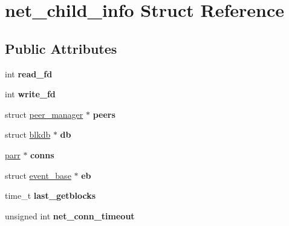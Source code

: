\hypertarget{structnet__child__info}{\section{net\-\_\-child\-\_\-info Struct Reference}
\label{structnet__child__info}
}
\subsection*{Public Attributes}
\begin{DoxyCompactItemize}
\item 
\hypertarget{structnet__child__info_aeb7c2e6b362b783a45f642b6657adb79}{int {\bfseries read\-\_\-fd}}\label{structnet__child__info_aeb7c2e6b362b783a45f642b6657adb79}

\item 
\hypertarget{structnet__child__info_a20f055e9469d205f63767478eb8b43d3}{int {\bfseries write\-\_\-fd}}\label{structnet__child__info_a20f055e9469d205f63767478eb8b43d3}

\item 
\hypertarget{structnet__child__info_a7d118ac5f9e703fc6683c85f924bcd23}{struct \hyperlink{structpeer__manager}{peer\-\_\-manager} $\ast$ {\bfseries peers}}\label{structnet__child__info_a7d118ac5f9e703fc6683c85f924bcd23}

\item 
\hypertarget{structnet__child__info_a65d7885acd7789351ccc097880bf9914}{struct \hyperlink{structblkdb}{blkdb} $\ast$ {\bfseries db}}\label{structnet__child__info_a65d7885acd7789351ccc097880bf9914}

\item 
\hypertarget{structnet__child__info_a6127de1099cbce59bc0d5c405999203b}{\hyperlink{structparr}{parr} $\ast$ {\bfseries conns}}\label{structnet__child__info_a6127de1099cbce59bc0d5c405999203b}

\item 
\hypertarget{structnet__child__info_a75b27e2f53a4706ccfb9b5ca876f223e}{struct \hyperlink{structevent__base}{event\-\_\-base} $\ast$ {\bfseries eb}}\label{structnet__child__info_a75b27e2f53a4706ccfb9b5ca876f223e}

\item 
\hypertarget{structnet__child__info_a26f00d62cd7687ce83caad7377596b67}{time\-\_\-t {\bfseries last\-\_\-getblocks}}\label{structnet__child__info_a26f00d62cd7687ce83caad7377596b67}

\item 
\hypertarget{structnet__child__info_a2aec83e11d8c71f10fe1288e6648a800}{unsigned int {\bfseries net\-\_\-conn\-\_\-timeout}}\label{structnet__child__info_a2aec83e11d8c71f10fe1288e6648a800}


\end{DoxyCompactItemize}

